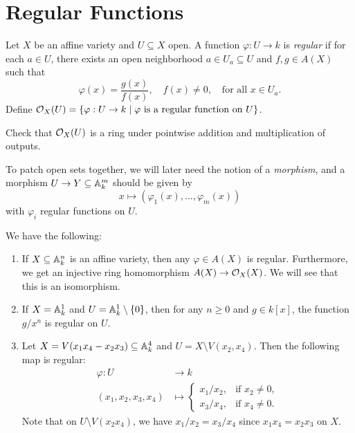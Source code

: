\section{Regular Functions}

\begin{definition}
  Let $X$ be an affine variety and
  $U \subseteq X$ open. A function
  $\varphi : U \to k$ is \emph{regular} if
  for each $a \in U$, there exists an
  open neighborhood $a \in U_a \subseteq U$
  and $f, g \in A(X)$ such that
  \[
    \varphi(x) = \frac{g(x)}{f(x)},
    \quad f(x) \ne 0,
    \quad \text{for all } x \in U_a.
  \]
  Define $\mathcal{O}_X(U) = \{\varphi : U \to k \mid \varphi \text{ is a regular function on } U\}$.
\end{definition}

\begin{exercise}
  Check that $\mathcal{O}_X(U)$ is a
  ring under pointwise addition and
  multiplication of outputs.
\end{exercise}

\begin{remark}
  To patch open sets together, we will
  later need the notion of a \emph{morphism},
  and
  a morphism $U \to Y \subseteq \mathbb{A}_k^m$
  should be given by
  \[
    x \longmapsto (\varphi_1(x), \dots, \varphi_m(x))
  \]
  with $\varphi_i$ regular functions on $U$.
\end{remark}

\begin{example}
  We have the following:
  \begin{enumerate}
    \item If $X \subseteq \mathbb{A}_k^n$
      is an affine variety, then any
      $\varphi \in A(X)$ is regular.
      Furthermore, we get an injective ring homomorphism
      $A(X) \to \mathcal{O}_X(X)$. We will see that
      this is an isomorphism.
    \item If $X = \mathbb{A}_k^1$ and
      $U = \mathbb{A}_k^1 \setminus \{0\}$,
      then for any $n \ge 0$ and
      $g \in k[x]$, the function
      $g / x^n$ is regular on $U$.
    \item Let $X = V(x_1x_4 - x_2 x_3) \subseteq \mathbb{A}_k^4$ and
      $U = X \setminus V(x_2, x_4)$.
      Then the following map is regular:
      \begin{align*}
        \varphi : U &\longrightarrow k \\
        (x_1, x_2, x_3, x_4) &\longmapsto
        \begin{cases}
          x_1 / x_2, & \text{if } x_2 \ne 0, \\
          x_3 / x_4, & \text{if } x_4 \ne 0.
        \end{cases}
      \end{align*}
      Note that on $U \setminus V(x_2 x_4)$,
      we have $x_1 / x_2 = x_3 / x_4$ since
      $x_1 x_4 = x_2 x_3$ on $X$.
  \end{enumerate}
\end{example}
